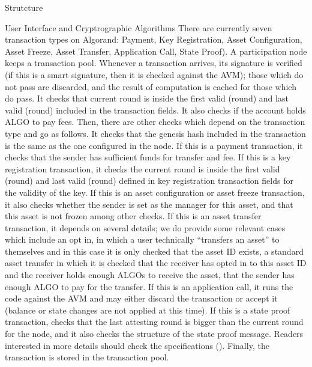 \documentclass[10pt,a4paper]{article}
\begin{document}
\begin{section}{Strutcture}
\begin{subsection}{User Interface and Cryptrographic Algorithms}
    There are currently seven transaction types on Algorand:
        Payment, 
        Key Registration, 
        Asset Configuration, 
        Asset Freeze, 
        Asset Transfer, 
        Application Call, 
        State Proof).
    A participation node keeps a transaction pool. 
    Whenever a transaction arrives, 
        its signature is verified (if this is a smart signature, then it is checked against the AVM); those
        which do not pass are discarded, and the result of computation is cached for those which do pass.
    It checks that current round is inside the first valid (round) and last valid (round) included in the
        transaction fields.
    It also checks if the account holds ALGO to pay fees. Then, there are other checks which depend on the
        transaction type and go as follows.
    It checks that the genesis hash included in the transaction is the same as the one configured in the node.
    If this is a payment transaction, it checks that the sender has sufficient funds for transfer and fee.
    If this is a key  registration transaction, it checks the current round is inside the first valid (round) 
        and last valid (round) defined in key registration transaction fields for the validity of the key.
    If this is an asset configuration or asset freeze transaction, it also checks whether the sender is set 
        as the manager for this asset, and that this asset is not frozen among other checks.
    If this is an asset transfer transaction, it depends on several details; we do provide some relevant 
        cases which include an opt in, in which a user technically ``transfers an asset'' to themselves and in this
        case it is only checked that the asset ID exists, 
        a standard asset transfer in which it is checked that the receiver has opted in to this asset ID and the 
        receiver holds enough ALGOs to receive the asset, that the sender has enough ALGO to pay for the transfer.
    If this is an application call, it runs the code against the AVM and may either discard the transaction or 
        accept it (balance or state changes are not applied at this time).
    If this is a state proof transaction, checks that the last attesting round is bigger than the current 
        round for the node, and it also checks the structure of the state proof message.
    Readers interested in more details should check the specifications (\cite{algorand:specs}).
    Finally, the transaction is stored in the transaction pool. 


\end{subsection}
\end{section}
\end{document}
